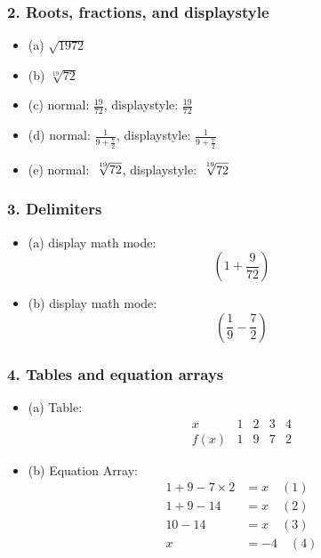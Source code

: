 \documentclass[a4paper,15pt]{article}
\begin{document}
\subsubsection*{2. Roots, fractions, and displaystyle}
\begin{itemize}
    \item (a) \(\sqrt{1972}\)
    \item (b) \(\sqrt[19]{72}\)
    \item (c) normal: \( \frac{19}{72} \), displaystyle: \(\displaystyle \frac{19}{72}\)
    \item (d) normal: \( \frac{1}{9+ \frac{7}{2}} \), displaystyle: \(\displaystyle \frac{1}{9 + \frac{7}{2}}\)
    \item (e) normal: \( \sqrt[\leftroot{-2}\uproot{2}19]{72} \), displaystyle: \(\displaystyle \sqrt[\leftroot{-2}\uproot{2}19]{72}\)
\end{itemize}

\subsubsection*{3. Delimiters}
\begin{itemize}
    \item (a) display math mode: \[\left( 1 + \frac{9}{72} \right)\]
    \item (b) display math mode: \[\left( \frac{1}{9} - \frac{7}{2} \right)\]
\end{itemize}

\subsubsection*{4. Tables and equation arrays}
\begin{itemize}
    \item (a) Table:
    \[
    \begin{array}{c|cccc}
    x & 1 & 2 & 3 & 4 \\
    \hline
    f(x) & 1 & 9 & 7 & 2
    \end{array}
    \]
    \item (b) Equation Array:
    \begin{align}
        1 + 9 - 7 \times 2 &= x \quad (1) \\
        1 + 9 - 14 &= x \quad (2) \\
        10 - 14 &= x \quad (3) \\
        x &= -4 \quad (4)
    \end{align}
\end{itemize}
\end{document}
